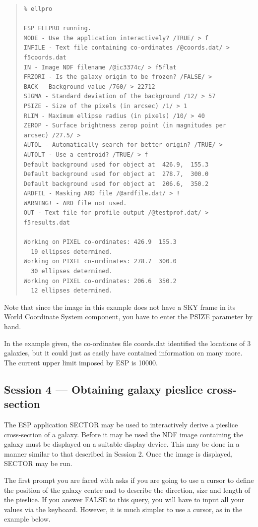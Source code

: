 \documentclass[twoside,11pt]{article}
\newcommand{\xlabel}[1]{}
\newenvironment{myquote}{\begin{quote}\begin{small}}{\end{small}\end{quote}}
\begin{document}
\begin{myquote}
\begin{verbatim}
% ellpro

ESP ELLPRO running.
MODE - Use the application interactively? /TRUE/ > f
INFILE - Text file containing co-ordinates /@coords.dat/ > f5coords.dat
IN - Image NDF filename /@ic3374c/ > f5flat
FRZORI - Is the galaxy origin to be frozen? /FALSE/ >
BACK - Background value /760/ > 22712
SIGMA - Standard deviation of the background /12/ > 57
PSIZE - Size of the pixels (in arcsec) /1/ > 1
RLIM - Maximum ellipse radius (in pixels) /10/ > 40
ZEROP - Surface brightness zerop point (in magnitudes per arcsec) /27.5/ >
AUTOL - Automatically search for better origin? /TRUE/ >
AUTOLT - Use a centroid? /TRUE/ > f
Default background used for object at  426.9,  155.3
Default background used for object at  278.7,  300.0
Default background used for object at  206.6,  350.2
ARDFIL - Masking ARD file /@ardfile.dat/ > !
WARNING! - ARD file not used.
OUT - Text file for profile output /@testprof.dat/ > f5results.dat

Working on PIXEL co-ordinates: 426.9  155.3
  19 ellipses determined.
Working on PIXEL co-ordinates: 278.7  300.0
  30 ellipses determined.
Working on PIXEL co-ordinates: 206.6  350.2
  12 ellipses determined.
\end{verbatim}
\end{myquote}

Note that since the image in this example does not have a SKY
frame in its World Coordinate System component,
you have to enter the PSIZE parameter by hand.

In the example given, the co-ordinates file coords.dat identified the
locations of 3 galaxies, but it could just as
easily have contained information on many more. The current
upper limit imposed by ESP is 10000.


\subsection{Session 4 --- Obtaining galaxy pieslice cross-section}
\xlabel{SESSION4}

The ESP application SECTOR may be used to interactively derive a
pieslice cross-section of a galaxy. Before it may be used the
NDF image containing the galaxy must be displayed on a suitable
display device. This may be done in a manner similar to
that described in Session 2. Once the image is displayed, SECTOR
may be run.

The first prompt you are faced with asks if you are going to use a cursor
to define the position of the galaxy centre and to describe the
direction, size and length of the pieslice. If you answer FALSE to this query,
you will have to input all your values via the keyboard. However, it is much
simpler to use a cursor, as in the example below.
\end{document}
